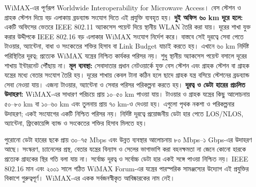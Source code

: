 WiMAX-এর পূর্ণরূপ Worldwide Interoperability for Microwave Access। বেস স্টেশন ও গ্রাহক স্টেশন দিয়ে বড় এলাকায় ব্রডব্যান্ড সংযোগ দিতে এই প্রযুক্তি ব্যবহৃত হয়।
\textbf{দুই অফিস ৬০ km দূরে হলে:} একটি অফিসের ভেতরে IEEE 802.11 অ্যাকসেস পয়েন্ট দিয়ে স্থানীয় WLAN তৈরি করা যায়। দূরের শাখা যুক্ত করার উদ্দীপকে IEEE 802.16 বড় এলাকার WiMAX সংযোগ নির্দেশ করে। বাস্তবে সেই দূরত্বে সেবা পেতে টাওয়ার, অ্যান্টেনা, বাধা ও সংকেতের শক্তির হিসাব বা Link Budget যাচাই করতে হয়। এখানে ৬০ km নির্দিষ্ট পরিস্থিতির দূরত্ব; প্রত্যেক WiMAX যন্ত্রের নিশ্চিত কার্যকর পরিসর নয়। শুধু স্থানীয় অ্যাকসেস পয়েন্ট বসালে দূরের শাখায় ইন্টারনেট পৌঁছায় না।
\textbf{মূল ব্যবস্থা:} সেবাদাতার প্রধান নেটওয়ার্কে যুক্ত বেস স্টেশন এবং গ্রাহক স্টেশন বা গ্রাহক যন্ত্রের মধ্যে বেতার সংযোগ তৈরি হয়। দূরের শাখায় কেবল টানা কঠিন হলে ছাদে গ্রাহক যন্ত্র বসিয়ে স্টেশনের ব্রডব্যান্ড সেবা নেওয়া যায়। এজন্য টাওয়ার, অ্যান্টেনা ও সেবার পরিসর পরিকল্পনা করতে হয়।
\textbf{দূরত্ব ও ডেটা হারের প্রচলিত উদাহরণ:} WiMAX-এর সাধারণ পরিচয়ে প্রায় ১০--৫০ km পাওয়া যায়। টাওয়ার ও গ্রাহক যন্ত্রের কিছু আলোচনায় ৫০--৮০ km বা ১০--৬০ km এবং তুলনায় প্রায় ৭০ km-ও দেওয়া হয়। এগুলো পৃথক নকশা ও পরিকল্পনার উদাহরণ; একই সংযোগের একটি নিশ্চিত পরিসর নয়। নির্দিষ্ট দূরত্বে প্রয়োজনীয় ডেটা হার পেতে LOS/NLOS, অ্যান্টেনা, ফ্রিকোয়েন্সি ব্যান্ড ও সংকেতের শক্তির হিসাব মিলতে হয়।

পুরোনো ডেটা হারের ছকে প্রায় ৩০--৭৫ Mbps এবং উন্নত ব্যবস্থার আলোচনায় ৮০ Mbps--১ Gbps-এর উদাহরণ আছে। সংস্করণ, চ্যানেলের প্রস্থ, বেতার যন্ত্রের বিন্যাস ও সেলের ভাগাভাগি করা বহনক্ষমতা না জেনে কোনো হারকে প্রত্যেক গ্রাহকের স্থির গতি বলা যায় না। সর্বোচ্চ দূরত্ব ও সর্বোচ্চ ডেটা হার একই সঙ্গে পাওয়া নিশ্চিত নয়। IEEE 802.16 মান এবং ২০০১ সালে গঠিত WiMAX Forum-এর যন্ত্রের পারস্পরিক সামঞ্জস্যের উদ্যোগ এই প্রযুক্তির বিকাশে গুরুত্বপূর্ণ। WiMAX-এর একক সর্বজনস্বীকৃত আবিষ্কারকের নাম নেই।


